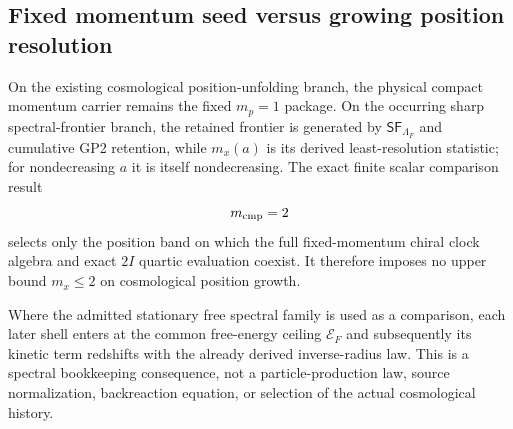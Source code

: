\documentclass[12pt,a4paper]{article}
\begin{document}

\subsection{Fixed momentum seed versus growing position resolution}
\label{p8:sec:v180-position-frontier-comparison-scope}

\begin{corollary}[Cosmological position unfolding preserves the $m_p=1$/$m_{\rm cmp}=2$ distinction]
\label{p8:cor:sharp-frontier-clock-energy-readouts}
On the existing cosmological position-unfolding branch, the physical compact
momentum carrier remains the fixed $m_p=1$ package.  On the occurring sharp
spectral-frontier branch, the retained frontier is generated by
$\mathsf{SF}_{\Lambda_F}$ and cumulative GP2 retention, while $m_x(a)$ is its
derived least-resolution statistic; for nondecreasing $a$ it is itself
nondecreasing.  The exact finite scalar comparison result
\[
 m_{\rm cmp}=2
\]
selects only the position band on which the full fixed-momentum chiral clock
algebra and exact $2I$ quartic evaluation coexist.  It therefore imposes no
upper bound $m_x\le2$ on cosmological position growth.

Where the admitted stationary free spectral family is used as a comparison,
each later shell enters at the common free-energy ceiling
$\mathcal E_F$ and subsequently its kinetic term redshifts with the already
derived inverse-radius law.  This is a spectral bookkeeping consequence, not
a particle-production law, source normalization, backreaction equation, or
selection of the actual cosmological history.
\end{corollary}

\end{document}
